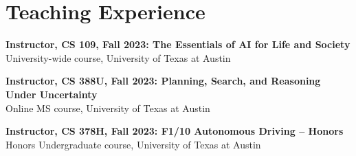 \documentclass[Times]{article}
\newcommand{\funding}[1]{#1\\}
\renewcommand{\funding}[1]{\\}
\begin{document}








\section*{Teaching Experience}

\setlength{\parskip}{1em}
{\bf Instructor, CS 109, Fall 2023: The Essentials of AI for Life and Society}\\
University-wide course, University of Texas at Austin

{\bf Instructor, CS 388U, Fall 2023: Planning, Search, and Reasoning Under Uncertainty}\\
Online MS course, University of Texas at Austin

{\bf Instructor, CS 378H, Fall 2023: F1/10 Autonomous Driving -- Honors}\\
Honors Undergraduate course, University of Texas at Austin
\end{document}
